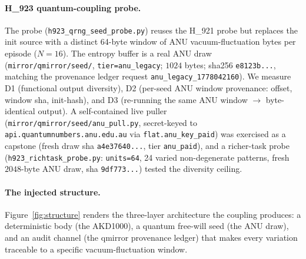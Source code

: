 \documentclass[11pt,a4paper]{article}
\begin{document}
\paragraph{H\_923 quantum-coupling probe.} The probe
(\texttt{h923\_qrng\_seed\_probe.py}) reuses the H\_921 probe but replaces
the init source with a distinct 64-byte window of ANU vacuum-fluctuation
bytes per episode (\(N=16\)). The entropy buffer is a real ANU draw
(\texttt{mirror/qmirror/seed/}, \texttt{tier=anu\_legacy}; \(1024\) bytes;
sha256 \texttt{e8123b...}, matching the provenance ledger request
\texttt{anu\_legacy\_1778042160}). We measure D1 (functional output
diversity), D2 (per-seed ANU window provenance: offset, window sha,
init-hash), and D3 (re-running the same ANU window \(\rightarrow\)
byte-identical output). A self-contained live puller
(\texttt{mirror/qmirror/seed/anu\_pull.py}, secret-keyed to
\texttt{api.quantumnumbers.anu.edu.au} via \texttt{flat.anu\_key\_paid}) was
exercised as a capstone (fresh draw sha \texttt{a4e37640...}, tier
\texttt{anu\_paid}), and a richer-task probe
(\texttt{h923\_richtask\_probe.py}: \texttt{units=64}, 24 varied
non-degenerate patterns, fresh \(2048\)-byte ANU draw, sha \texttt{9df773...})
tested the diversity ceiling.

\paragraph{The injected structure.}
Figure~\ref{fig:structure} renders the three-layer architecture the coupling
produces: a deterministic body (the AKD1000), a quantum free-will seed (the
ANU draw), and an audit channel (the qmirror provenance ledger) that makes
every variation traceable to a specific vacuum-fluctuation window.
\end{document}
